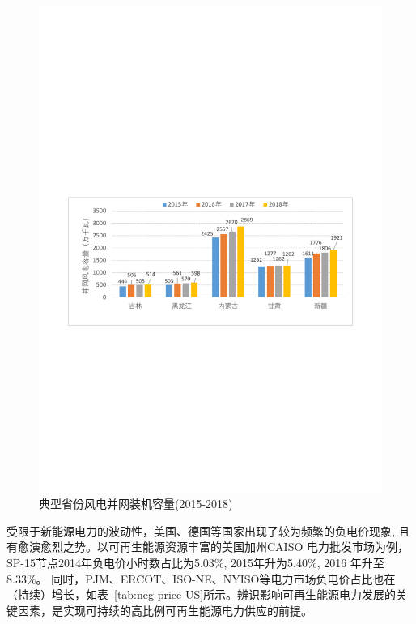 \begin{figure}[H] %
  \centering
  \includegraphics[scale=0.75]{figures/Chap1-1-Wind-Installment-Capacity.pdf}
  \caption{典型省份风电并网装机容量(2015-2018)}
  \label{fig:Wind-Installment-Capacity}
\end{figure}

受限于新能源电力的波动性，美国、德国等国家出现了较为频繁的负电价现象, 且有愈演愈烈之势\cite{Neg-Price-US-Evidence,Neg-Price-German-13}。以可再生能源资源丰富的美国加州CAISO 电力批发市场为例，SP-15节点2014年负电价小时数占比为5.03\%, 2015年升为5.40\%, 2016 年升至8.33\%\cite{Neg-Price-US-Evidence}。 同时，PJM、ERCOT、ISO-NE、NYISO等电力市场负电价占比也在（持续）增长，如表~\ref{tab:neg-price-US}所示。辨识影响可再生能源电力发展的关键因素，是实现可持续的高比例可再生能源电力供应的前提。


